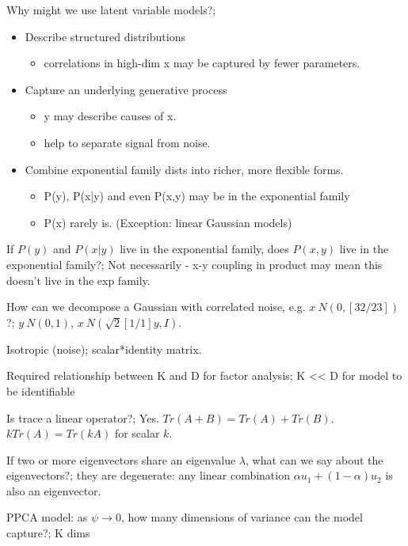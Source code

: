\documentclass{article}
\begin{document}
Why might we use latent variable models?; \begin{itemize} \item Describe structured distributions \begin{itemize} \item correlations in high-dim x may be captured by fewer parameters.  \end{itemize} \item Capture an underlying generative process \begin{itemize} \item y may describe causes of x.  \item help to separate signal from noise.  \end{itemize} \item Combine exponential family dists into richer, more flexible forms.  \begin{itemize} \item P(y), P(x|y) and even P(x,y) may be in the exponential family \item P(x) rarely is. (Exception: linear Gaussian models) \end{itemize} \end{itemize}

If $P(y)$ and $P(x|y)$ live in the exponential family, does $P(x,y)$ live in the exponential family?; Not necessarily - x-y coupling in product may mean this doesn't live in the exp family.

How can we decompose a Gaussian with correlated noise, e.g. $x~N(0, [ 3 2 / 2 3])$?; $y~N(0,1)$, $x~N(\sqrt{2}[1 / 1]y, I)$.

Isotropic (noise); scalar*identity matrix.

Required relationship between K and D for factor analysis; K << D for model to be identifiable

Is trace a linear operator?; Yes. $Tr(A+B) = Tr(A)+Tr(B)$. $kTr(A) = Tr(kA)$ for scalar $k$.

If two or more eigenvectors share an eigenvalue $\lambda$, what can we say about the eigenvectors?; they are degenerate: any linear combination $\alpha u_1 + (1-\alpha)u_2$ is also an eigenvector.

PPCA model: as $\psi\rightarrow 0$, how many dimensions of variance can the model capture?; K dims
\end{document}
